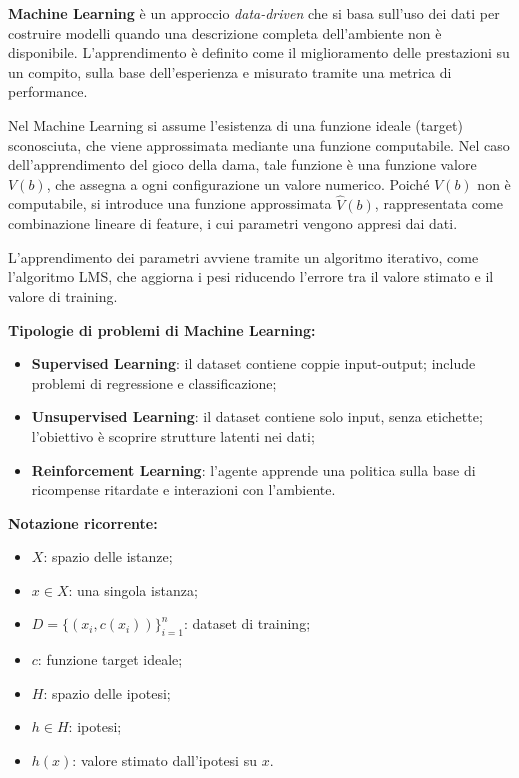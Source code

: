 \documentclass[a4paper,12pt]{report}
\begin{document}
\begin{center}
\colorbox{green!10}{
\begin{minipage}{0.95\textwidth}

\textbf{Machine Learning} è un approccio \textit{data-driven} che si basa sull’uso dei dati per costruire modelli quando una descrizione completa dell’ambiente non è disponibile.
L’apprendimento è definito come il miglioramento delle prestazioni su un compito, sulla base dell’esperienza e misurato tramite una metrica di performance.

Nel Machine Learning si assume l’esistenza di una funzione ideale (target) sconosciuta, che viene approssimata mediante una funzione computabile.
Nel caso dell’apprendimento del gioco della dama, tale funzione è una funzione valore \( V(b) \), che assegna a ogni configurazione un valore numerico.
Poiché \( V(b) \) non è computabile, si introduce una funzione approssimata \( \hat V(b) \), rappresentata come combinazione lineare di feature, i cui parametri vengono appresi dai dati.

L’apprendimento dei parametri avviene tramite un algoritmo iterativo, come l’algoritmo LMS, che aggiorna i pesi riducendo l’errore tra il valore stimato e il valore di training.

\medskip
\textbf{Tipologie di problemi di Machine Learning:}
\begin{itemize}
    \item \textbf{Supervised Learning}: il dataset contiene coppie input-output; include problemi di regressione e classificazione;
    \item \textbf{Unsupervised Learning}: il dataset contiene solo input, senza etichette; l’obiettivo è scoprire strutture latenti nei dati;
    \item \textbf{Reinforcement Learning}: l’agente apprende una politica sulla base di ricompense ritardate e interazioni con l’ambiente.
\end{itemize}

\medskip
\textbf{Notazione ricorrente:}
\begin{itemize}
    \item \( X \): spazio delle istanze;
    \item \( x \in X \): una singola istanza;
    \item \( D = \{(x_i, c(x_i))\}_{i=1}^n \): dataset di training;
    \item \( c \): funzione target ideale;
    \item \( H \): spazio delle ipotesi;
    \item \( h \in H \): ipotesi;
    \item \( h(x) \): valore stimato dall’ipotesi su \( x \).
\end{itemize}


\end{minipage}}
\end{center}
\end{document}
